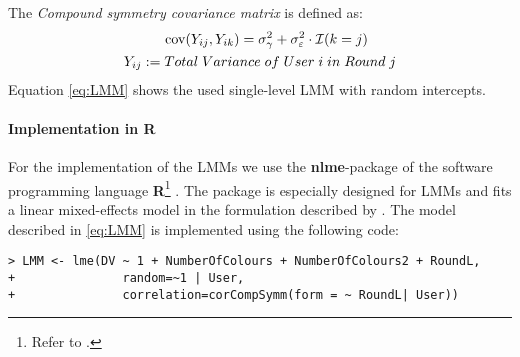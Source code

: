 The \textit{Compound symmetry covariance matrix} is defined as:
\begin{equation}
\begin{split}
{\rm cov}(Y_{ij}, Y_{ik}) = \sigma^{2}_{\gamma} + \sigma^{2}_{\varepsilon} \cdot \mathcal{I}(k = j) \quad \quad \\
Y_{ij}:= Total\;Variance\;of\;User\;i\;in\;Round\;j
\end{split}
\end{equation}
Equation \ref{eq:LMM} shows the used single-level \ac{LMM} with random intercepts.


\paragraph{Implementation in R}
For the implementation of the \ac{LMM}s we use the \textbf{nlme}-package of the software programming language \textbf{R}\footnote{Refer to \cite{R2012}.} . The package is especially designed for \ac{LMM}s  \citep{Pinheiro2013} and fits a linear mixed-effects model in the formulation described by \cite{Laird1982}.
\newpage
The model described in \ref{eq:LMM} is implemented using the following code:
\begin{verbatim}
> LMM <- lme(DV ~ 1 + NumberOfColours + NumberOfColours2 + RoundL, 
+               random=~1 | User, 
+               correlation=corCompSymm(form = ~ RoundL| User))
\end{verbatim}

